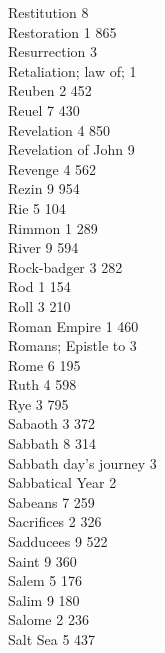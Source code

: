 Restitution \hfill 8 \\
Restoration \hfill 1 \quad \phantom{0}865\\
Resurrection \hfill 3 \\
Retaliation; law of; \hfill 1 \\
Reuben \hfill 2 \quad \phantom{0}452\\
Reuel \hfill 7 \quad \phantom{0}430\\
Revelation \hfill 4 \quad \phantom{0}850\\
Revelation of John \hfill 9 \\
Revenge \hfill 4 \quad \phantom{0}562\\
Rezin \hfill 9 \quad \phantom{0}954\\
Rie \hfill 5 \quad \phantom{0}104\\
Rimmon \hfill 1 \quad \phantom{0}289\\
River \hfill 9 \quad \phantom{0}594\\
Rock-badger \hfill 3 \quad \phantom{0}282\\
Rod \hfill 1 \quad \phantom{0}154\\
Roll \hfill 3 \quad \phantom{0}210\\
Roman Empire \hfill 1 \quad \phantom{0}460\\
Romans; Epistle to \hfill 3 \\
Rome \hfill 6 \quad \phantom{0}195\\
Ruth \hfill 4 \quad \phantom{0}598\\
Rye \hfill 3 \quad \phantom{0}795\\
Sabaoth \hfill 3 \quad \phantom{0}372\\
Sabbath \hfill 8 \quad \phantom{0}314\\
Sabbath day’s journey \hfill 3 \\
Sabbatical Year \hfill 2 \\
Sabeans \hfill 7 \quad \phantom{0}259\\
Sacrifices \hfill 2 \quad \phantom{0}326\\
Sadducees \hfill 9 \quad \phantom{0}522\\
Saint \hfill 9 \quad \phantom{0}360\\
Salem \hfill 5 \quad \phantom{0}176\\
Salim \hfill 9 \quad \phantom{0}180\\
Salome \hfill 2 \quad \phantom{0}236\\
Salt Sea \hfill 5 \quad \phantom{0}437\\
